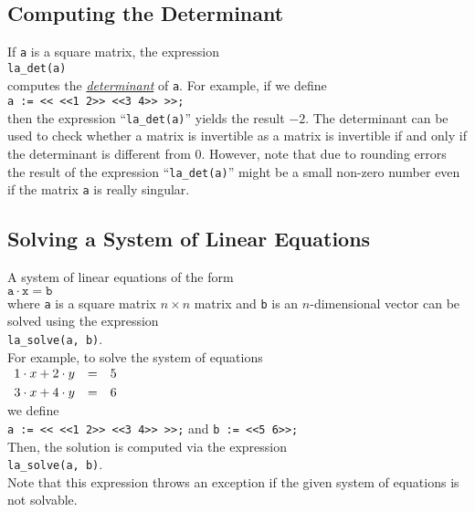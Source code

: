 \subsection{Computing the Determinant}
If \texttt{a} is a square matrix, the expression 
\\[0.2cm]
\hspace*{1.3cm}
\texttt{la\_det(a)}
\\[0.2cm]
computes the \href{http://en.wikipedia.org/wiki/Determinant}{\emph{determinant}} of \texttt{a}.
For example, if we define 
\\[0.2cm]
\hspace*{1.3cm}
\texttt{a := << <<1 2>> <<3 4>> >>;}
\\[0.2cm]
then the expression ``\texttt{la\_det(a)}'' yields the result $-2$.  The determinant can be used to
check whether a matrix is invertible as a matrix is invertible if and only if the determinant
is different from $0$.  However, note that due to rounding errors the result of the expression 
``\texttt{la\_det(a)}''  might be a small non-zero number even if the matrix \texttt{a} is really
singular. 

\subsection{Solving a System of Linear Equations}
A system of linear equations of the form
\\[0.2cm]
\hspace*{1.3cm}
$\texttt{a} \cdot \texttt{x} = \texttt{b}$
\\[0.2cm]
where \texttt{a} is a square matrix $n \times n$  matrix and  \texttt{b} is an $n$-dimensional
vector can be solved using the expression
\\[0.2cm]
\hspace*{1.3cm}
\texttt{la\_solve(a, b)}.
\\[0.2cm]
For example, to solve the system of equations
\\[0.2cm]
\hspace*{1.3cm}
$
\begin{array}[c]{lcl}
  1 \cdot x + 2 \cdot y & = & 5 \\[0.1cm]
  3 \cdot x + 4 \cdot y & = & 6 
\end{array}
$
\\[0.2cm]
we define
\\[0.2cm]
\hspace*{1.3cm}
\texttt{a := << <<1 2>> <<3 4>> >>;} \quad and \quad \texttt{b := <<5 6>>;}
\\[0.2cm]
Then, the solution is computed via the expression
\\[0.2cm]
\hspace*{1.3cm}
\texttt{la\_solve(a, b)}.
\\[0.2cm]
Note that this expression throws an exception if the given system of equations is not solvable.

